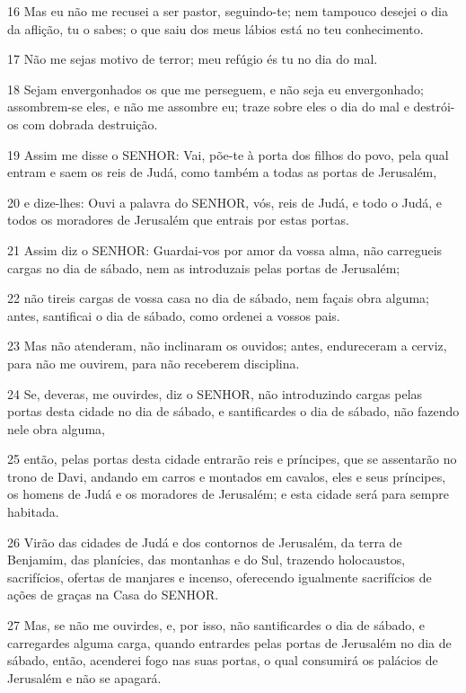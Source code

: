 \par 16 Mas eu não me recusei a ser pastor, seguindo-te; nem tampouco desejei o dia da aflição, tu o sabes; o que saiu dos meus lábios está no teu conhecimento.
\par 17 Não me sejas motivo de terror; meu refúgio és tu no dia do mal.
\par 18 Sejam envergonhados os que me perseguem, e não seja eu envergonhado; assombrem-se eles, e não me assombre eu; traze sobre eles o dia do mal e destrói-os com dobrada destruição.
\par 19 Assim me disse o SENHOR: Vai, põe-te à porta dos filhos do povo, pela qual entram e saem os reis de Judá, como também a todas as portas de Jerusalém,
\par 20 e dize-lhes: Ouvi a palavra do SENHOR, vós, reis de Judá, e todo o Judá, e todos os moradores de Jerusalém que entrais por estas portas.
\par 21 Assim diz o SENHOR: Guardai-vos por amor da vossa alma, não carregueis cargas no dia de sábado, nem as introduzais pelas portas de Jerusalém;
\par 22 não tireis cargas de vossa casa no dia de sábado, nem façais obra alguma; antes, santificai o dia de sábado, como ordenei a vossos pais.
\par 23 Mas não atenderam, não inclinaram os ouvidos; antes, endureceram a cerviz, para não me ouvirem, para não receberem disciplina.
\par 24 Se, deveras, me ouvirdes, diz o SENHOR, não introduzindo cargas pelas portas desta cidade no dia de sábado, e santificardes o dia de sábado, não fazendo nele obra alguma,
\par 25 então, pelas portas desta cidade entrarão reis e príncipes, que se assentarão no trono de Davi, andando em carros e montados em cavalos, eles e seus príncipes, os homens de Judá e os moradores de Jerusalém; e esta cidade será para sempre habitada.
\par 26 Virão das cidades de Judá e dos contornos de Jerusalém, da terra de Benjamim, das planícies, das montanhas e do Sul, trazendo holocaustos, sacrifícios, ofertas de manjares e incenso, oferecendo igualmente sacrifícios de ações de graças na Casa do SENHOR.
\par 27 Mas, se não me ouvirdes, e, por isso, não santificardes o dia de sábado, e carregardes alguma carga, quando entrardes pelas portas de Jerusalém no dia de sábado, então, acenderei fogo nas suas portas, o qual consumirá os palácios de Jerusalém e não se apagará.

